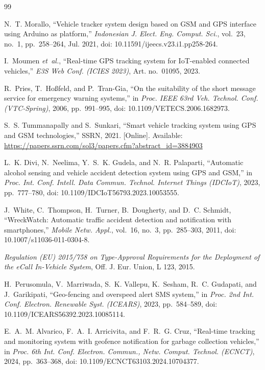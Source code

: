 \documentclass[conference]{IEEEtran}
\begin{document}
\begin{thebibliography}{99}
\footnotesize

N.~T. Morallo, ``Vehicle tracker system design based on GSM and GPS interface using Arduino as platform,'' \emph{Indonesian J. Elect. Eng. Comput. Sci.}, vol.~23, no.~1, pp.~258--264, Jul. 2021, doi: 10.11591/ijeecs.v23.i1.pp258-264.



I.~Moumen \emph{et~al.}, ``Real-time GPS tracking system for IoT-enabled connected vehicles,'' \emph{E3S Web Conf. (ICIES 2023)}, Art. no.~01095, 2023.

R.~Pries, T.~Ho{\ss}feld, and P.~Tran-Gia, ``On the suitability of the short message service for emergency warning systems,'' in \emph{Proc. IEEE 63rd Veh. Technol. Conf. (VTC-Spring)}, 2006, pp.~991--995, doi: 10.1109/VETECS.2006.1682973.

S.~S. Tummanapally and S.~Sunkari, ``Smart vehicle tracking system using GPS and GSM technologies,'' SSRN, 2021. [Online]. Available: \url{https://papers.ssrn.com/sol3/papers.cfm?abstract_id=3884903}

L.~K. Divi, N.~Neelima, Y.~S.~K. Gudela, and N.~R. Palaparti, ``Automatic alcohol sensing and vehicle accident detection system using GPS and GSM,'' in \emph{Proc. Int. Conf. Intell. Data Commun. Technol. Internet Things (IDCIoT)}, 2023, pp.~777--780, doi: 10.1109/IDCIoT56793.2023.10053555.

J.~White, C.~Thompson, H.~Turner, B.~Dougherty, and D.~C. Schmidt, ``WreckWatch: Automatic traffic accident detection and notification with smartphones,'' \emph{Mobile Netw. Appl.}, vol.~16, no.~3, pp.~285--303, 2011, doi: 10.1007/s11036-011-0304-8.

\emph{Regulation (EU) 2015/758 on Type-Approval Requirements for the Deployment of the eCall In-Vehicle System}, Off. J. Eur. Union, L 123, 2015.

H.~Perusomula, V.~Marriwada, S.~K. Vallepu, K.~Sesham, R.~C. Gudapati, and J.~Garikipati, ``Geo-fencing and overspeed alert SMS system,'' in \emph{Proc. 2nd Int. Conf. Electron. Renewable Syst. (ICEARS)}, 2023, pp.~584--589, doi: 10.1109/ICEARS56392.2023.10085114.

E.~A.~M. Alvarico, F.~A.~I. Arricivita, and F.~R.~G. Cruz, ``Real-time tracking and monitoring system with geofence notification for garbage collection vehicles,'' in \emph{Proc. 6th Int. Conf. Electron. Commun., Netw. Comput. Technol. (ECNCT)}, 2024, pp.~363--368, doi: 10.1109/ECNCT63103.2024.10704377.


\end{thebibliography}
\end{document}
